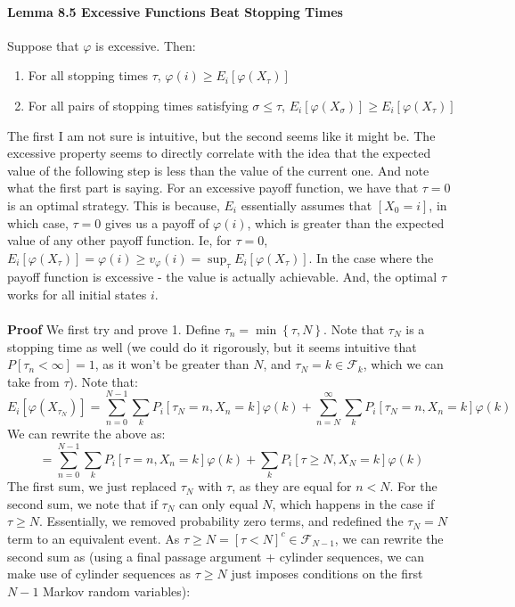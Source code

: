 \documentclass[12pt,a4paper]{article}
\newcommand{\1}[1]{\mathbbm{1}\left\{ #1 \right\}}
\newcommand{\fcal}{\mathcal{F}}
\begin{document}
\paragraph{Lemma 8.5 Excessive Functions Beat Stopping Times} Suppose that $\varphi$ is excessive. Then:
\begin{enumerate}
	\item For all stopping times $\tau$, $\varphi(i) \geq E_i\left[\varphi(X_\tau)\right]$
	\item For all pairs of stopping times satisfying $\sigma \leq \tau$, $E_i\left[\varphi(X_\sigma)\right] \geq E_i\left[\varphi(X_\tau)\right]$
\end{enumerate}
The first I am not sure is intuitive, but the second seems like it might be. The excessive property seems to directly correlate with the idea that the expected value of the following step is less than the value of the current one. And note what the first part is saying. For an excessive payoff function, we have that $\tau = 0$ is an optimal strategy. This is because, $E_i$ essentially assumes that $[X_0 = i]$, in which case, $\tau = 0$ gives us a payoff of $\varphi(i)$, which is greater than the expected value of any other payoff function. Ie, for $\tau = 0$, $E_i\left[\varphi(X_\tau)\right] = \varphi(i) \geq v_\varphi(i) = \sup_\tau E_i\left[\varphi(X_\tau)\right]$. In the case where the payoff function is excessive - the value is actually achievable. And, the optimal $\tau$ works for all initial states $i$. 
\\\\
\textbf{Proof} We first try and prove 1. Define $\tau_n = \min\left\{\tau,N\right\}$. Note that $\tau_N$ is a stopping time as well (we could do it rigorously, but it seems intuitive that $P[\tau_n < \infty] = 1$, as it won't be greater than $N$, and $\tau_N = k \in \fcal_k$, which we can take from $\tau$). Note that:
$$
	E_i\left[\varphi(X_{\tau_N})\right] =
	\sum_{n=0}^{N-1} \sum_k P_i\left[\tau_N = n, X_n = k\right]\varphi(k) +
	\sum_{n=N}^\infty \sum_k P_i\left[\tau_N = n, X_n = k\right]\varphi(k)
$$
We can rewrite the above as:
$$
	=
	\sum_{n=0}^{N-1} \sum_k P_i\left[\tau = n, X_n = k\right]\varphi(k) +
	\sum_k P_i\left[\tau \geq N, X_N = k\right]\varphi(k)
$$
The first sum, we just replaced $\tau_N$ with $\tau$, as they are equal for $n < N$. For the second sum, we note that if $\tau_N$ can only equal $N$, which happens in the case if $\tau \geq N$. Essentially, we removed probability zero terms, and redefined the $\tau_N = N$ term to an equivalent event. As $\tau \geq N = \left[\tau < N\right]^c \in \fcal_{N - 1}$, we can rewrite the second sum as (using a final passage argument + cylinder sequences, we can make use of cylinder sequences as $\tau \geq N$ just imposes conditions on the first $N - 1$ Markov random variables):
\end{document}
